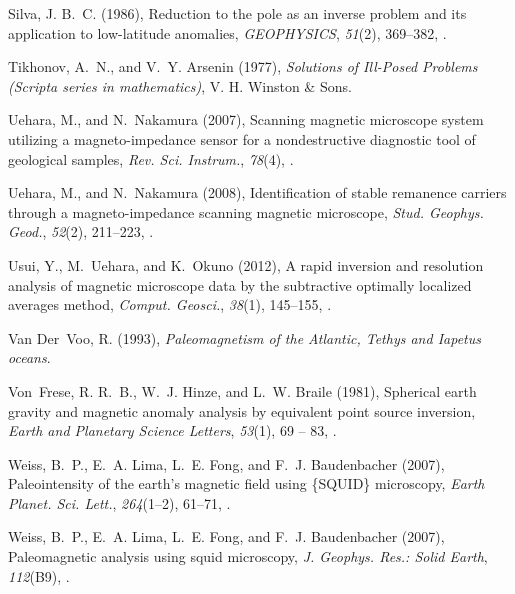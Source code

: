 \documentclass[galley,gc]{agutex}
\begin{document}
\begin{article}
\begin{thebibliography}{42}
Silva, J. B.~C. (1986), Reduction to the pole as an inverse problem and its
  application to low-latitude anomalies, \textit{GEOPHYSICS}, \textit{51}(2),
  369--382, .

Tikhonov, A.~N., and V.~Y. Arsenin (1977), \textit{Solutions of Ill-Posed
  Problems (Scripta series in mathematics)}, V. H. Winston \& Sons.

Uehara, M., and N.~Nakamura (2007), Scanning magnetic microscope system
  utilizing a magneto-impedance sensor for a nondestructive diagnostic tool of
  geological samples, \textit{Rev. Sci. Instrum.}, \textit{78}(4),
  .

Uehara, M., and N.~Nakamura (2008), Identification of stable remanence carriers
  through a magneto-impedance scanning magnetic microscope, \textit{Stud.
  Geophys. Geod.}, \textit{52}(2), 211--223, .

Usui, Y., M.~Uehara, and K.~Okuno (2012), A rapid inversion and resolution
  analysis of magnetic microscope data by the subtractive optimally localized
  averages method, \textit{Comput. Geosci.}, \textit{38}(1), 145--155,
  .

Van Der~Voo, R. (1993), \textit{Paleomagnetism of the Atlantic, Tethys and
  Iapetus oceans}.

Von~Frese, R. R.~B., W.~J. Hinze, and L.~W. Braile (1981), Spherical earth
  gravity and magnetic anomaly analysis by equivalent point source inversion,
  \textit{Earth and Planetary Science Letters}, \textit{53}(1), 69 -- 83,
  .

Weiss, B.~P., E.~A. Lima, L.~E. Fong, and F.~J. Baudenbacher
  (2007{}), Paleointensity of the earth's magnetic field using
  \{SQUID\} microscopy, \textit{Earth Planet. Sci. Lett.}, \textit{264}(1–2),
  61--71, .

Weiss, B.~P., E.~A. Lima, L.~E. Fong, and F.~J. Baudenbacher
  (2007{}), Paleomagnetic analysis using squid microscopy,
  \textit{J. Geophys. Res.: Solid Earth}, \textit{112}(B9),
  .


\end{thebibliography}
\end{article}
\end{document}
